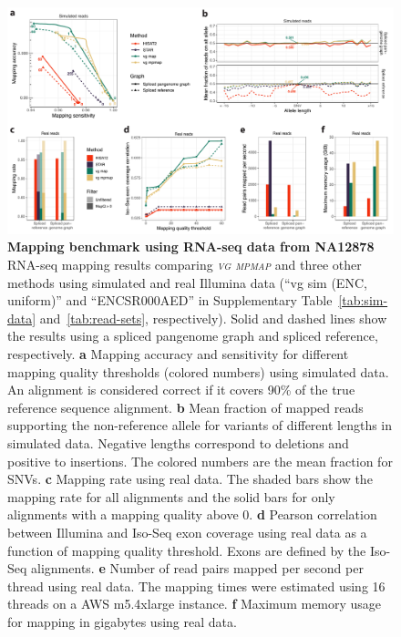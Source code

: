 \documentclass[11pt]{ucthesis}
\newcommand{\tool}[1]{\emph{\textsc{#1}}}
\begin{document}
\begin{figure}[h!]
\begin{center}
\includegraphics[width=\textwidth]{mpmapfigures/figure2.pdf}
\caption{\textbf{Mapping benchmark using RNA-seq data from NA12878} \\
RNA-seq mapping results comparing \tool{vg mpmap} and three other methods using simulated and real Illumina data (``vg sim (ENC, uniform)'' and ``ENCSR000AED'' in Supplementary Table~\ref{tab:sim-data} and~\ref{tab:read-sets}, respectively). Solid and dashed lines show the results using a spliced pangenome graph and spliced reference, respectively. \textbf{a} Mapping accuracy and sensitivity for different mapping quality thresholds (colored numbers) using simulated data. An alignment is considered correct if it covers 90\% of the true reference sequence alignment. \textbf{b} Mean fraction of mapped reads supporting the non-reference allele for variants of different lengths in simulated data. Negative lengths correspond to deletions and positive to insertions. The colored numbers are the mean fraction for SNVs. \textbf{c} Mapping rate using real data. The shaded bars show the mapping rate for all alignments and the solid bars for only alignments with a mapping quality above 0. \textbf{d} Pearson correlation between Illumina and Iso-Seq exon coverage using real data as a function of mapping quality threshold. Exons are defined by the Iso-Seq alignments. \textbf{e} Number of read pairs mapped per second per thread using real data. The mapping times were estimated using 16 threads on a AWS m5.4xlarge instance. \textbf{f} Maximum memory usage for mapping in gigabytes using real data.  
} \label{fig:mapping}
\end{center}
\end{figure}
\end{document}
